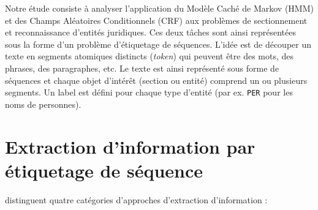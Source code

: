 Notre étude consiste à analyser l'application du Modèle Caché de Markov (HMM) et des Champs Aléatoires Conditionnels (CRF) aux problèmes de sectionnement et reconnaissance d'entités juridiques. Ces deux tâches sont ainsi représentées sous la forme d'un problème d'étiquetage de séquences. L'idée est de découper un texte en segments atomiques distincts (\textit{token}) qui peuvent être des mots, des phrases, des paragraphes, etc. Le texte est ainsi représenté sous forme de séquences et chaque objet d'intérêt (section ou entité) comprend  un ou plusieurs segments. Un label est défini pour chaque type d'entité (par ex. \verb|PER| pour les noms de personnes). 


\section{Extraction d'information par étiquetage de séquence}
\label{sec:structuration:biblio}

\citet{chau2002nerwithNN} distinguent quatre catégories d'approches d'extraction d'information :

